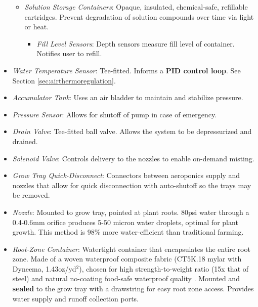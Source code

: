 \begin{itemize}
\begin{itemize}
        \item \textit{Solution Storage Containers}: Opaque, insulated, chemical-safe, refillable cartridges. Prevent degradation of solution compounds over time via light or heat.
        \begin{itemize}
            \item \textit{Fill Level Sensors}: Depth sensors measure fill level of container. Notifies user to refill.
        \end{itemize}
    \end{itemize}
    \item \textit{Water Temperature Sensor}: Tee-fitted. Informs a \textbf{PID control loop}. See Section \ref{sec:airthermoregulation}.
    \item \textit{Accumulator Tank}: Uses an air bladder to maintain and stabilize pressure.
    \item \textit{Pressure Sensor}: Allows for shutoff of pump in case of emergency.
    \item \textit{Drain Valve}: Tee-fitted ball valve. Allows the system to be depressurized and drained.
    \item \textit{Solenoid Valve}: Controls delivery to the nozzles to enable on-demand misting.
    \item \textit{Grow Tray Quick-Disconnect}: Connectors between aeroponics supply and nozzles that allow for quick disconnection with auto-shutoff so the trays may be removed.
    \item \textit{Nozzle}: Mounted to grow tray, pointed at plant roots. 80psi water through a 0.4-0.6mm orifice produces 5-50 micron water droplets, optimal for plant growth. This method is 98\% more water-efficient than traditional farming.%
    \item \textit{Root-Zone Container}: Watertight container that encapsulates the entire root zone. Made of a woven waterproof composite fabric (CT5K.18 mylar with Dyneema, 1.43oz/yd${}^2$), chosen for high strength-to-weight ratio (15x that of steel) and natural no-coating food-safe waterproof quality \cite{dyneema}. Mounted and \textbf{sealed} to the grow tray with a drawstring for easy root zone access. Provides water supply and runoff collection ports.
\end{itemize}